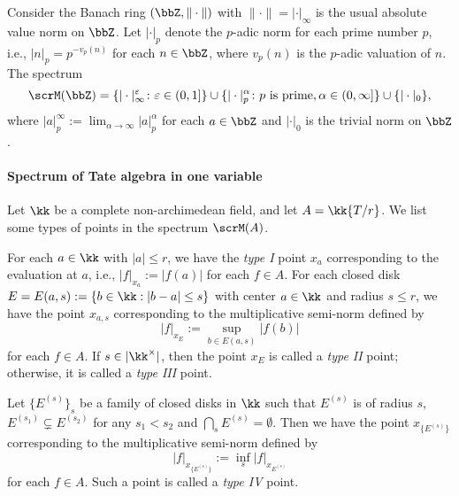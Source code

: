     \begin{example}\label{eg:spectrum_of_Z_with_absolute_value_norm}
        Consider the Banach ring \((\bbZ, \|\cdot\|)\) with \(\|\cdot\| = |\cdot|_\infty\) is the usual absolute value norm on \(\bbZ\).
        Let \(|\cdot|_p\) denote the \(p\)-adic norm for each prime number \(p\), i.e., \(|n|_p = p^{-v_p(n)}\) for each \(n \in \bbZ\), where \(v_p(n)\) is the \(p\)-adic valuation of \(n\).
        The spectrum 
        \[ \scrM(\bbZ) = \{|\cdot|_{\infty}^\varepsilon \colon \varepsilon \in (0,1]\} \cup \{| \cdot |_p^\alpha \colon p \text{ is prime}, \alpha \in (0,\infty] \} \cup \{|\cdot|_0\}, \]
        where \(|a|_p^\infty := \lim_{\alpha \to \infty} |a|_p^\alpha\) for each \(a \in \bbZ\) and \(|\cdot|_0\) is the trivial norm on \(\bbZ\).
    \end{example}

    \paragraph{Spectrum of Tate algebra in one variable} Let \(\kk\) be a complete non-archimedean field, and let \(A = \kk\{T/r\}\).
    We list some types of points in the spectrum \(\scrM(A)\).

    For each \(a \in \kk\) with \(|a| \leq r\), we have the \emph{type I} point \(x_a\) corresponding to the evaluation at \(a\), i.e., \(|f|_{x_a} := |f(a)|\) for each \(f \in A\).
    For each closed disk \(E = E(a,s) := \{b \in \kk : |b - a| \leq s\}\) with center \(a \in \kk\) and radius \(s \leq r\), we have the point \(x_{a,s}\) corresponding to the multiplicative semi-norm defined by
    \[ |f|_{x_E} := \sup_{b \in E(a,s)} |f(b)| \]
    for each \(f \in A\).
    If \(s \in |\kk^\times|\), then the point \(x_E\) is called a \emph{type II} point; otherwise, it is called a \emph{type III} point.
    
    Let \(\{E^{(s)}\}_s\) be a family of closed disks in \(\kk\) such that \(E^{(s)}\) is of radius \(s\), \(E^{(s_1)} \subsetneq E^{(s_2)}\) for any \(s_1 < s_2\) and \(\bigcap_s E^{(s)} = \emptyset\).
    Then we have the point \(x_{\{E^{(s)}\}}\) corresponding to the multiplicative semi-norm defined by
    \[ |f|_{x_{\{E^{(s)}\}}} := \inf_s |f|_{x_{E^{(s)}}} \]
    for each \(f \in A\).
    Such a point is called a \emph{type IV} point.



